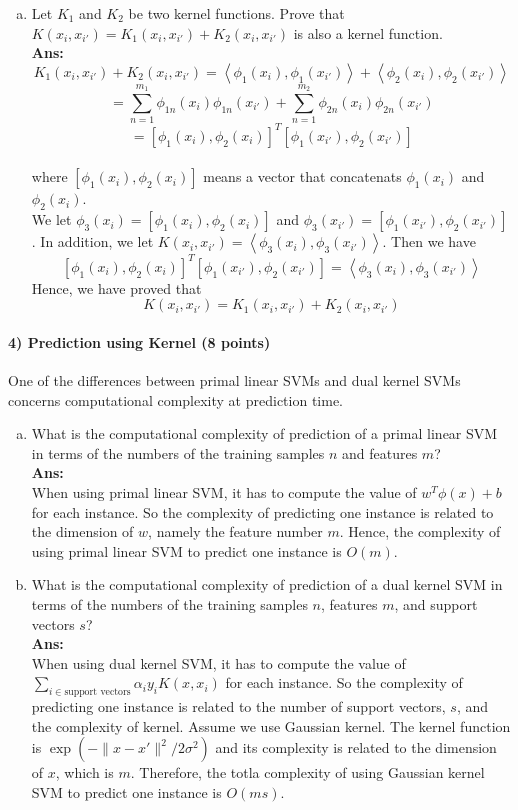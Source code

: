 \documentclass[11pt]{article}
\begin{document}
\begin{enumerate}[(c)]
\item Let $K_1$ and $K_2$ be two kernel functions. Prove that $K(x_i,x_{i'}) = K_1(x_i,x_{i'}) + K_2(x_i,x_{i'})$ is also a kernel function.\\
\textbf{Ans:}
$$K_1(x_i, x_{i'}) + K_2(x_i, x_{i'}) 
= \left<\phi_1(x_i),\phi_1(x_{i'})\right> + \left<\phi_2(x_i),\phi_2(x_{i'})\right>$$
%
$$= \sum_{n=1}^{m_1}\phi_{1n}(x_i)\phi_{1n}(x_{i'}) + \sum_{n=1}^{m_2}\phi_{2n}(x_i)\phi_{2n}(x_{i'})$$
%
$$= [\phi_{1}(x_i), \phi_{2}(x_i)]^T[\phi_{1}(x_{i'}), \phi_{2}(x_{i'})]$$\\
%
where $[\phi_{1}(x_i), \phi_{2}(x_i)]$ means a vector that concatenats $\phi_{1}(x_i)$ and $\phi_{2}(x_i)$.\\
We let $\phi_3(x_i) = [\phi_{1}(x_i), \phi_{2}(x_i)]$ and $\phi_3(x_{i'}) = [\phi_{1}(x_{i'}), \phi_{2}(x_{i'})]$. In addition, we let $K(x_i, x_{i'}) = \left<\phi_3(x_i), \phi_3(x_{i'})\right>$. Then we have
$$[\phi_{1}(x_i), \phi_{2}(x_i)]^T[\phi_{1}(x_{i'}), \phi_{2}(x_{i'})] = \left<\phi_3(x_i), \phi_3(x_{i'})\right>$$
Hence, we have proved that 
$$K(x_i,x_{i'}) = K_1(x_i,x_{i'}) + K_2(x_i,x_{i'})$$

\end{enumerate}

\newpage
\paragraph{4) Prediction using Kernel (8 points)} 
One of the differences between primal linear SVMs and dual kernel SVMs concerns computational complexity at prediction time.
\begin{enumerate}[(a)]
\item What is the computational complexity of prediction of a primal linear SVM in terms of the numbers of the training samples $n$ and features $m$?\\
\textbf{Ans:}\\
When using primal linear SVM, it has to compute the value of $w^T\phi(x) + b$ for each instance. So the complexity of predicting one instance is related to the dimension of $w$, namely the feature number $m$. Hence, the complexity of using primal linear SVM to predict one instance is $O(m)$.\\

\item What is the computational complexity of prediction of a dual kernel SVM in terms of the numbers of the training samples $n$, features $m$, and support vectors $s$?\\
\textbf{Ans:}\\
When using dual kernel SVM, it has to compute the value of $\sum_{i \in \text{support vectors}}\alpha_iy_iK(x, x_i)$ for each instance. So the complexity of predicting one instance is related to the number of support vectors, $s$, and the complexity of kernel. Assume we use Gaussian kernel. The kernel function is $\exp(-\|x-x'\|^2 / 2 \sigma^2)$ and its complexity is related to the dimension of $x$, which is $m$. Therefore, the totla complexity of using Gaussian kernel SVM to predict one instance is $O(ms)$.
\end{enumerate}
\end{document}
